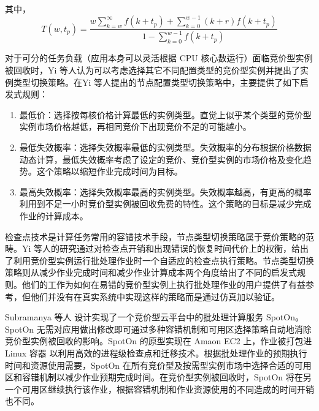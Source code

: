 其中，
\begin{equation}\label{eq_t}\nonumber 
T(w,t_p) = \frac{w\sum_{k=w}^{\infty}f(k+t_p)+\sum_{k=0}^{w-1}(k+r)f(k+t_p)}{1-\sum_{k=0}^{w-1}f(k+t_p)}
\end{equation}

对于可分的任务负载（应用本身可以灵活根据 CPU 核心数运行）面临竞价型实例被回收时，Yi 等人认为可以考虑选择其它不同配置类型的竞价型实例并提出了实例类型切换策略。在Yi 等人提出的节点配置类型切换策略中，主要提供了如下启发式规则：
\begin{enumerate}
\item 最低价：选择按每核价格计算最低的实例类型。直觉上似乎某个类型的竞价型实例市场价格越低，再相同竞价下出现竞价不足的可能越小。
\item 最低失效概率：选择失效概率最低的实例类型。失效概率的分布根据价格数据动态计算，最低失效概率考虑了设定的竞价、竞价型实例的市场价格及变化趋势。这个策略以缩短作业完成时间为目标。
\item 最高失效概率：选择失效概率最高的实例类型。失效概率越高，有更高的概率利用到不足一小时竞价型实例被回收免费的特性。这个策略的目标是减少完成作业的计算成本。
\end{enumerate}

检查点技术是计算任务常用的容错技术手段，节点类型切换策略属于竞价策略的范畴。Yi 等人的研究通过对检查点开销和出现错误的恢复时间代价上的权衡，给出了利用竞价型实例运行批处理作业时一个自适应的检查点执行策略。节点类型切换策略则从减少作业完成时间和减少作业计算成本两个角度给出了不同的启发式规则。他们的工作为如何在易错的竞价型实例上执行批处理作业的用户提供了有益参考，但他们并没有在真实系统中实现这样的策略而是通过仿真加以验证。

Subramanya 等人 \cite{Subramanya:2015:SBC:2806777.2806851} 设计实现了一个竞价型云平台中的批处理计算服务 SpotOn。SpotOn 无需对应用做出修改即可通过多种容错机制和可用区选择策略自动地消除竞价型实例被回收的影响。SpotOn 的原型实现在 Amaon EC2 上，作业被打包进 Linux 容器 \cite{LXC} 以利用高效的进程级检查点和迁移技术。根据批处理作业的预期执行时间和资源使用需要，SpotOn 在所有竞价型及按需型实例市场中选择合适的可用区和容错机制以减少作业预期完成时间。在竞价型实例被回收时，SpotOn 将在另一个可用区继续执行该作业，根据容错机制和作业资源使用的不同造成的时间开销也不同。

